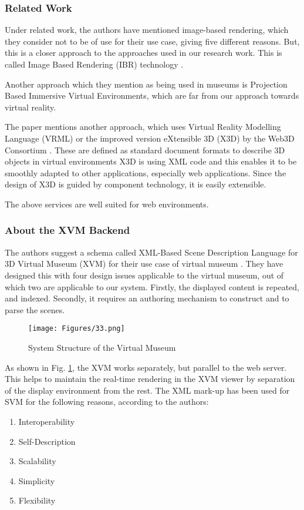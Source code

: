 \subsubsection{Related Work}
Under related work, the authors have mentioned image-based rendering, which they consider not to be of use for their use case, giving five different reasons. But, this is a closer approach to the approaches used in our research work. This is called Image Based Rendering (IBR) technology \cite{Kang00}.

Another approach which they mention as being used in museums is Projection Based Immersive Virtual Environments, which are far from our approach towards virtual reality.

The paper mentions another approach, which uses Virtual Reality Modelling Language (VRML) \cite{vrml} or the improved version eXtensible 3D (X3D) by the Web3D Consortium \cite{x3d}. These are defined as standard document formats to describe 3D objects in virtual environments X3D is using XML code and this enables it to be smoothly adapted to other applications, especially web applications. Since the design of X3D is guided by component technology, it is easily extensible.

The above services are well suited for web environments.

\subsubsection{About the XVM Backend}
The authors suggest a schema called XML-Based Scene Description Language for 3D Virtual Museum (XVM) for their use case of virtual museum \cite{Lu2008}. They have designed this with four design issues applicable to the virtual museum, out of which two are applicable to our system. Firstly, the displayed content is repeated, and indexed. Secondly, it requires an authoring mechanism to construct and to parse the scenes.

\begin{figure}[htbp]
\begin{center}
\texttt{[image: Figures/33.png]}
\caption{System Structure of the Virtual Museum}
\label{fig2_virtual_museum}
\end{center}
\end{figure}

As shown in Fig. \ref{fig2_virtual_museum}, the XVM works separately, but parallel to the web server. This helps to maintain the real-time rendering in the XVM viewer by separation of the display environment from the rest.
The XML mark-up has been used for SVM for the following reasons, according to the authors:
\begin{enumerate}
\item{Interoperability}
\item{Self-Description}
\item{Scalability}
\item{Simplicity}
\item{Flexibility}
\end{enumerate}

